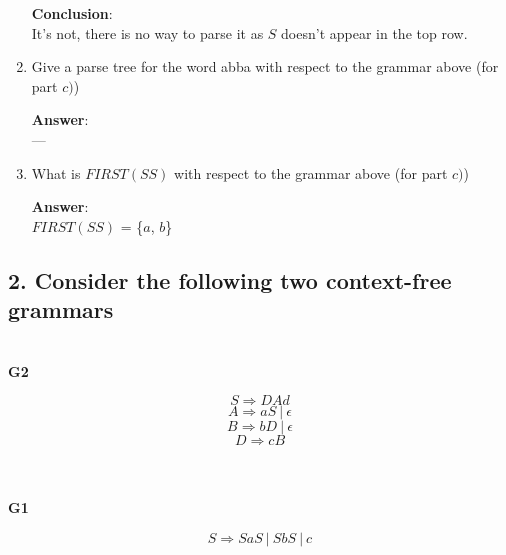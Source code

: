 \documentclass[a4paper, 14pt]{report}
\newcommand{\answer}[1]{%
	\textbf{Answer}:\\
	#1}
\newcommand{\question}[1]{\subsection*{#1}}
\begin{document}
\begin{enumerate}[label=(\alph*)]
{			\textbf{Conclusion}: \\
			It's not, there is no way to parse it as $S$ doesn't appear in the top row.
		}

	\item Give a parse tree for the word abba with respect to the grammar above (for part $c)$)

		\answer{%
			---
		}

	\item What is $FIRST(SS)$ with respect to the grammar above (for part $c)$)

		\answer{$FIRST(SS)$ = \{$a$, $b$\}}

\end{enumerate}		


\pagebreak

\question{2. Consider the following two context-free grammars}

\begin{multicols}{2}

	\begin{center} \textbf{\\G2} \end{center}

	\[ S \Rightarrow DAd \]
	\[ A \Rightarrow aS\ |\ \epsilon \]
	\[ B \Rightarrow bD\ |\ \epsilon \]
	\[ D \Rightarrow cB \]

	\begin{center} \textbf{\\\\G1} \end{center}

	\[ S \Rightarrow SaS\ |\ SbS\ |\ c \] \\

\end{multicols}
\end{document}
